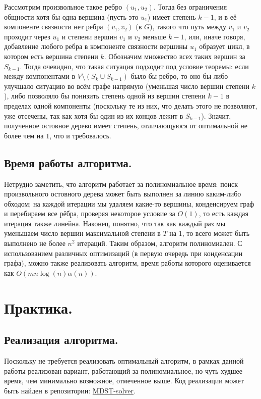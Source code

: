 \documentclass[a4paper,11pt]{article}
\theoremstyle{plain}
\theoremstyle{definition}
\theoremstyle{remark}
\begin{document}
Рассмотрим произвольное такое ребро $(u_1, u_2)$. Тогда без ограничения общности хотя бы одна вершина (пусть это $u_1$) имеет степень $k-1$, и в её компоненте связности нет ребра $(v_1, v_2)$ (в $G$), такого что путь между $v_1$ и $v_2$ проходит через $u_1$ и степени вершин $v_1$ и $v_2$ меньше $k-1$, или, иначе говоря, добавление любого ребра в компоненте связности вершины $u_1$ образует цикл, в котором есть вершина степени $k$. Обозначим множество всех таких вершин за $S_{k-1}$. Тогда очевидно, что такая ситуация подходит под условие теоремы: если между компонентами в $V \setminus (S_k \cup S_{k-1})$ было бы ребро, то оно бы либо улучшало ситуацию во всём графе напрямую (уменьшая число вершин степени $k$), либо позволяло бы понизить степень одной из вершин степени $k-1$ в пределах одной компоненты (поскольку те из них, что делать этого не позволяют, уже отсечены, так как хотя бы один из их концов лежит в $S_{k-1}$). Значит, полученное остовное дерево имеет степень, отличающуюся от оптимальной не более чем на $1$, что и требовалось.

\subsection{Время работы алгоритма.}

Нетрудно заметить, что алгоритм работает за полиномиальное время: поиск произвольного остовного дерева может быть выполнен за линию каким-либо обходом; на каждой итерации мы удаляем какие-то вершины, конденсируем граф и перебираем все рёбра, проверяя некоторое условие за $O(1)$, то есть каждая итерация также линейна. Наконец, понятно, что так как каждый раз мы уменьшаем число вершин максимальной степени в $T$ на $1$, то всего может быть выполнено не более $n^2$ итераций. Таким образом, алгоритм полиномиален. С использованием различных оптимизаций (в первую очередь при конденсации графа), можно также реализовать алгоритм, время работы которого оценивается как $O(mn\log (n) \alpha(n))$.

\section{Практика.}

\subsection{Реализация алгоритма.}

Поскольку не требуется реализовать оптимальный алгоритм, в рамках данной работы реализован вариант, работающий за полиномиальное, но чуть худшее время, чем минимально возможное, отмеченное выше. Код реализации может быть найден в репозитории: \href{https://github.com/notdenied/MDST-solver}{MDST-solver}.
\end{document}
